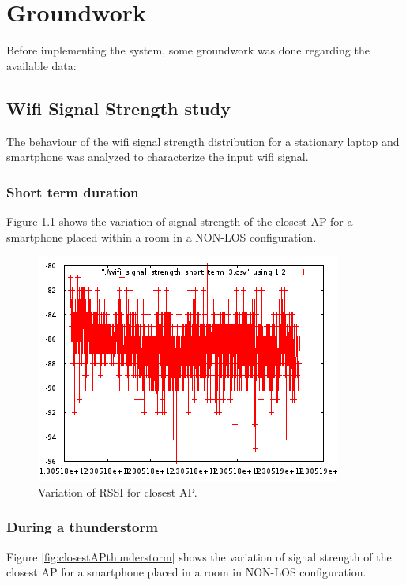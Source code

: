 \chapter{Groundwork}
Before implementing the system, some groundwork was done regarding the available data:

\section{Wifi Signal Strength study}

The behaviour of the wifi signal strength distribution for a stationary laptop 
and smartphone was analyzed to characterize the input wifi signal.

\subsection{Short term duration}

Figure \ref{fig:closestAPshortterm} shows the variation of signal strength of 
the closest AP for a smartphone placed within a room in a NON-LOS configuration.

\begin{figure}\centering
    \includegraphics{figures/short_term_wifi.png}
    \caption{Variation of RSSI for closest AP. \label{fig:closestAPshortterm}}
\end{figure}


\subsection{During a thunderstorm}

Figure \ref{fig:closestAPthunderstorm} shows the variation of signal strength of
the closest AP for a smartphone placed in a room in NON-LOS configuration.

